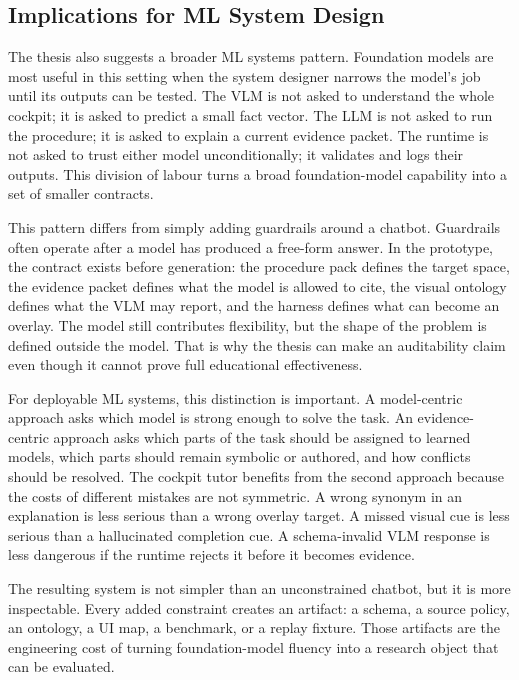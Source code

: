 \subsection{Implications for ML System Design}

The thesis also suggests a broader ML systems pattern. Foundation models are
most useful in this setting when the system designer narrows the model's job
until its outputs can be tested. The VLM is not asked to understand the whole
cockpit; it is asked to predict a small fact vector. The LLM is not asked to
run the procedure; it is asked to explain a current evidence packet. The
runtime is not asked to trust either model unconditionally; it validates and
logs their outputs. This division of labour turns a broad foundation-model
capability into a set of smaller contracts.

This pattern differs from simply adding guardrails around a chatbot. Guardrails
often operate after a model has produced a free-form answer. In the prototype, the
contract exists before generation: the procedure pack defines the target space,
the evidence packet defines what the model is allowed to cite, the visual
ontology defines what the VLM may report, and the harness defines what can
become an overlay. The model still contributes flexibility, but the shape of
the problem is defined outside the model. That is why the thesis can make an
auditability claim even though it cannot prove full educational effectiveness.

For deployable ML systems, this distinction is important. A model-centric
approach asks which model is strong enough to solve the task. An evidence-
centric approach asks which parts of the task should be assigned to learned
models, which parts should remain symbolic or authored, and how conflicts
should be resolved. The cockpit tutor benefits from the second approach because
the costs of different mistakes are not symmetric. A wrong synonym in an
explanation is less serious than a wrong overlay target. A missed visual cue is
less serious than a hallucinated completion cue. A schema-invalid VLM response
is less dangerous if the runtime rejects it before it becomes evidence.

The resulting system is not simpler than an unconstrained chatbot, but it is
more inspectable. Every added constraint creates an artifact: a schema, a
source policy, an ontology, a UI map, a benchmark, or a replay fixture. Those
artifacts are the engineering cost of turning foundation-model fluency into a
research object that can be evaluated.

